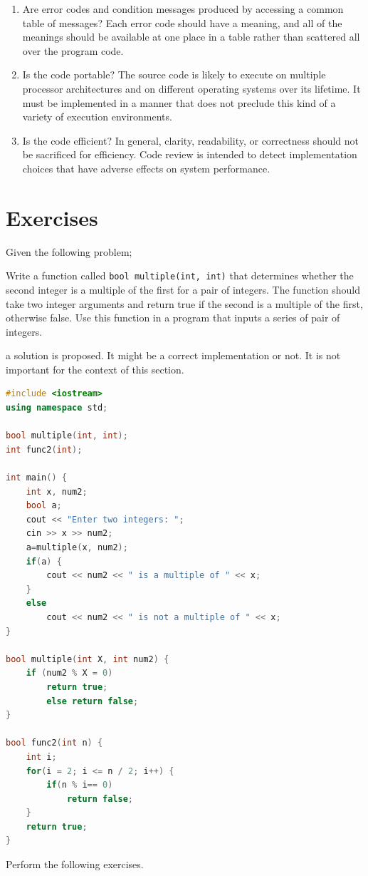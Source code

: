 \begin{enumerate}[nosep]
    \item Are error codes and condition messages produced by accessing a common table of messages? Each error code should have a meaning, and all of the meanings should be available at one place in a table rather than scattered all over the program code.
    \item Is the code portable? The source code is likely to execute on multiple processor architectures and on different operating systems over its lifetime. It must be implemented in a manner that does not preclude this kind of a variety of execution environments.
    \item Is the code efficient? In general, clarity, readability, or correctness should not be sacrificed for efficiency. Code review is intended to detect implementation choices that have adverse effects on system performance.
\end{enumerate}

\section{Exercises}
Given the following problem;
\begin{displayquote}
    Write a function called \lstinline!bool multiple(int, int)! that determines whether the second integer is a multiple of the first for a pair of integers. The function should take two integer arguments and return true if the second is a multiple of the first, otherwise false. Use this function in a program that inputs a series of pair of integers.
\end{displayquote}
a solution is proposed. It might be a correct implementation or not. It is not important for the context of this section.
\begin{lstlisting}[language=C++,caption={A \CC~program that confirms a number is multiple of another.}]
#include <iostream>
using namespace std;

bool multiple(int, int);
int func2(int);

int main() {
    int x, num2;
    bool a;
    cout << "Enter two integers: ";
    cin >> x >> num2;
    a=multiple(x, num2);
    if(a) {
        cout << num2 << " is a multiple of " << x;
    }
    else
        cout << num2 << " is not a multiple of " << x;
}

bool multiple(int X, int num2) {
    if (num2 % X = 0)
        return true;
        else return false;
}

bool func2(int n) {
    int i;
    for(i = 2; i <= n / 2; i++) {
        if(n % i== 0)
            return false;
    }
    return true;
}
\end{lstlisting}
Perform the following exercises.

